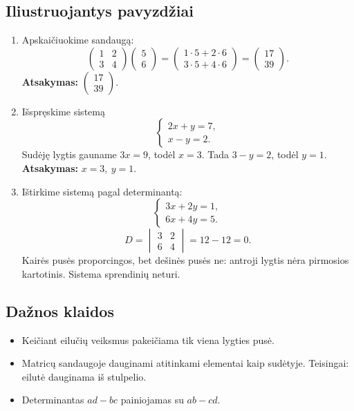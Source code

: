 \subsection{Iliustruojantys pavyzdžiai}
\begin{enumerate}[label=\arabic*.]
\item Apskaičiuokime sandaugą:
\[
\begin{pmatrix}1&2\\3&4\end{pmatrix}
\begin{pmatrix}5\\6\end{pmatrix}
=
\begin{pmatrix}1\cdot5+2\cdot6\\3\cdot5+4\cdot6\end{pmatrix}
=
\begin{pmatrix}17\\39\end{pmatrix}.
\]
\textbf{Atsakymas:} \(\begin{pmatrix}17\\39\end{pmatrix}\).

\item Išspręskime sistemą
\[
\begin{cases}
2x+y=7,\\
x-y=2.
\end{cases}
\]
Sudėję lygtis gauname \(3x=9\), todėl \(x=3\). Tada \(3-y=2\), todėl \(y=1\).
\textbf{Atsakymas:} \(x=3,\ y=1\).

\item Ištirkime sistemą pagal determinantą:
\[
\begin{cases}
3x+2y=1,\\
6x+4y=5.
\end{cases}
\]
\[
D=\begin{vmatrix}3&2\\6&4\end{vmatrix}=12-12=0.
\]
Kairės pusės proporcingos, bet dešinės pusės ne: antroji lygtis nėra pirmosios kartotinis. Sistema sprendinių neturi.
\end{enumerate}

\subsection{Dažnos klaidos}
\begin{itemize}
\item Keičiant eilučių veiksmus pakeičiama tik viena lygties pusė.
\item Matricų sandaugoje dauginami atitinkami elementai kaip sudėtyje. Teisingai: eilutė dauginama iš stulpelio.
\item Determinantas \(ad-bc\) painiojamas su \(ab-cd\).
\end{itemize}


